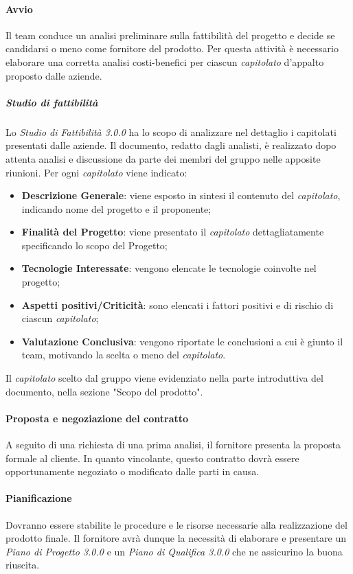 \paragraph{Avvio}
Il team conduce un analisi preliminare sulla fattibilità del progetto e decide se candidarsi o meno come fornitore del prodotto. Per questa attività è necessario elaborare una corretta analisi costi-benefici per ciascun \textit{capitolato\glo} d'appalto proposto dalle aziende.
\subparagraph*{Studio di fattibilità}
Lo \textit{Studio di Fattibilità 3.0.0\doc} ha lo scopo di analizzare nel dettaglio i capitolati presentati dalle aziende. Il documento,  redatto dagli analisti, è realizzato dopo attenta analisi e discussione da parte dei membri del gruppo nelle apposite riunioni. Per ogni \textit{capitolato\glo} viene indicato:
\begin{itemize}
	\item \textbf{Descrizione Generale}: viene esposto in sintesi il contenuto del \textit{capitolato\glos}, indicando nome del progetto e il proponente;
	\item \textbf{Finalità del Progetto}: viene presentato il \textit{capitolato\glo} dettagliatamente specificando lo scopo del Progetto;
	\item \textbf{Tecnologie Interessate}: vengono elencate le tecnologie coinvolte nel progetto;
	\item \textbf{Aspetti positivi/Criticità}: sono elencati i fattori positivi e di rischio di ciascun \textit{capitolato\glos};
	\item \textbf{Valutazione Conclusiva}: vengono riportate le conclusioni a cui è giunto il team, motivando la scelta o meno del \textit{capitolato\glos}.
\end{itemize}
Il \textit{capitolato\glo} scelto dal gruppo viene evidenziato nella parte introduttiva del documento, nella sezione "Scopo del prodotto".

\paragraph{Proposta e negoziazione del contratto}
A seguito di una richiesta di una prima analisi, il fornitore presenta la proposta formale al cliente. In quanto vincolante, questo contratto dovrà essere opportunamente negoziato o modificato dalle parti in causa.

\paragraph{Pianificazione}  Dovranno essere stabilite le procedure e le risorse necessarie alla realizzazione del prodotto finale. Il fornitore avrà dunque la necessità di elaborare e presentare un \textit{Piano di Progetto 3.0.0\doc} e un \textit{Piano di Qualifica 3.0.0\doc} che ne assicurino la buona riuscita.

